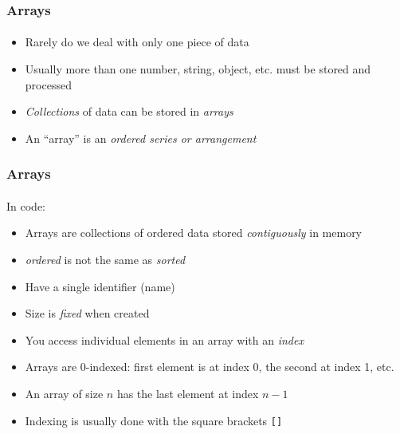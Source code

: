 \documentclass[]{beamer}
\begin{document}
\begin{frame}[fragile]
    \frametitle{Arrays}
    \framesubtitle{}

\begin{itemize}[<+->]
  \item Rarely do we deal with only one piece of data
  \item Usually more than one number, string, object, etc. must be stored and processed
  \item \emph{Collections} of data can be stored in \emph{arrays}
  \item An ``array'' is an \emph{ordered series or arrangement}
\end{itemize}

\end{frame}


\begin{frame}[fragile]
    \frametitle{Arrays}
    \framesubtitle{}

In code:
\begin{itemize}[<+->]
  \item Arrays are collections of ordered data stored \emph{contiguously} in memory  
  \item \emph{ordered} is not the same as \emph{sorted}
  \item Have a single identifier (name)
  \item Size is \emph{fixed} when created
  \item You access individual elements in an array with an \emph{index}
  \item Arrays are 0-indexed: first element is at index 0, the second at index 1, etc.
  \item An array of size $n$ has the last element at index $n-1$
  \item Indexing is usually done with the square brackets \texttt{[]}
\end{itemize}

\end{frame}
\end{document}
